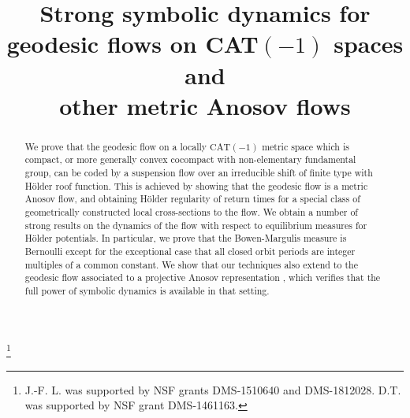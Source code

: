\documentclass[JEP,XML,SOM,Unicode,NoFloatCountersInSection]{cedram}
\theoremstyle{definition}
\numberwithin{equation}{section}
\begin{document}
\title[Strong symbolic dynamics for metric Anosov flows]{Strong symbolic dynamics for\\ geodesic flows on CAT$(-1)$ spaces and\\ other metric Anosov flows}

\author[\initial{D.} \lastname{Constantine}]{ }
\address{Wesleyan University,
Mathematics and Computer Science Department\\
Middletown, CT 06459}

\author[\initial{J.-F.} \lastname{Lafont}]{ }
\address{Department of Mathematics,
Ohio State University\\
Columbus, Ohio 43210}

\author[\initial{D.} \middlename{J.} \lastname{Thompson}]{\nobreakauthor {}\nobreakauthor {}}
\address{Department of Mathematics,
Ohio State University\\
Columbus, Ohio 43210}

\thanks{J.-F. L. was supported by NSF grants DMS-1510640 and DMS-1812028. D.T. was supported by NSF grant DMS-1461163.}

\begin{abstract}
We prove that the geodesic flow on a locally $\mathrm{CAT}(-1)$ metric space which is compact, or more generally convex cocompact with non-elementary fundamental group, can be coded by a suspension flow over an irreducible shift of finite type with Hölder roof function. This is achieved by showing that the geodesic flow is a metric Anosov flow, and obtaining Hölder regularity of return times for a special class of geometrically constructed local cross-sections to the flow. We obtain a number of strong results on the dynamics of the flow with respect to equilibrium measures for Hölder potentials. In particular, we prove that the Bowen-Margulis measure is Bernoulli except for the exceptional case that all closed orbit periods are integer multiples of a common constant. We show that our techniques also extend to the geodesic flow associated to a projective Anosov representation \cite{bcls}, which verifies that the full power of symbolic dynamics is available in that setting.
\end{abstract}
\end{document}
